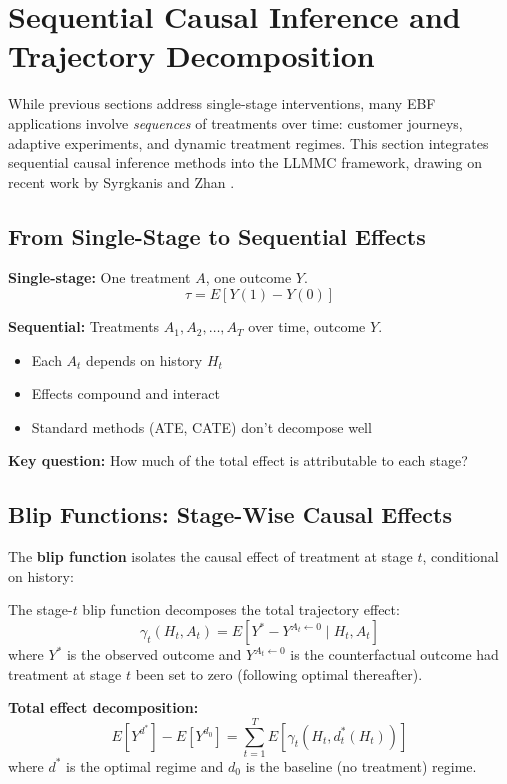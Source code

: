 \section{Sequential Causal Inference and Trajectory Decomposition}
\label{sec:iii-seq}

While previous sections address single-stage interventions, many EBF applications
involve \emph{sequences} of treatments over time: customer journeys, adaptive
experiments, and dynamic treatment regimes. This section integrates sequential
causal inference methods into the LLMMC framework, drawing on recent work by
Syrgkanis and Zhan \citep{syrgkanis2025postrl}.

\subsection{From Single-Stage to Sequential Effects}

\begin{tcolorbox}[colback=red!5!white, colframe=red!75!black,
    title=The Sequential Challenge]

\textbf{Single-stage:} One treatment $A$, one outcome $Y$.
\[
\tau = E[Y(1) - Y(0)]
\]

\textbf{Sequential:} Treatments $A_1, A_2, \ldots, A_T$ over time, outcome $Y$.
\begin{itemize}[nosep]
\item Each $A_t$ depends on history $H_t$
\item Effects compound and interact
\item Standard methods (ATE, CATE) don't decompose well
\end{itemize}

\textbf{Key question:} How much of the total effect is attributable to each stage?
\end{tcolorbox}

\subsection{Blip Functions: Stage-Wise Causal Effects}

The \textbf{blip function} \citep{robins2000msm, syrgkanis2025postrl}
isolates the causal effect of treatment at stage $t$, conditional on history:

\begin{tcolorbox}[colback=blue!5!white, colframe=blue!75!black,
    title=Axiom UNMAPPED_CAL-8: Blip Decomposition (Syrgkanis-Zhan)]
The stage-$t$ blip function decomposes the total trajectory effect:
\[
\gamma_t(H_t, A_t) = E[Y^* - Y^{A_t \leftarrow 0} \mid H_t, A_t]
\]
where $Y^*$ is the observed outcome and $Y^{A_t \leftarrow 0}$ is the counterfactual
outcome had treatment at stage $t$ been set to zero (following optimal thereafter).

\textbf{Total effect decomposition:}
\[
E[Y^{d^*}] - E[Y^{d_0}] = \sum_{t=1}^{T} E[\gamma_t(H_t, d^*_t(H_t))]
\]
where $d^*$ is the optimal regime and $d_0$ is the baseline (no treatment) regime.
\end{tcolorbox}

